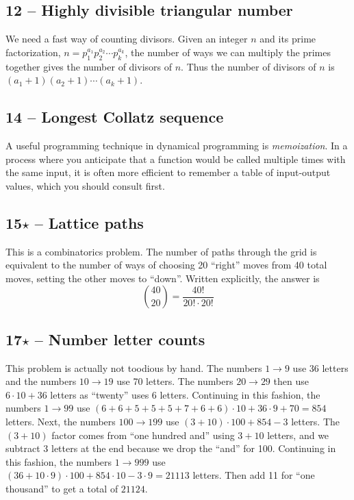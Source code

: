 \documentclass{article}
\begin{document}
\subsection*{12 -- Highly divisible triangular number} 
We need a fast way of counting divisors. 
Given an integer $n$ and its prime factorization, $n = p_1^{a_1} p_2^{a_2} \dotsb p_k^{a_k}$, the number of ways we can multiply the primes together gives the number of divisors of $n$. 
Thus the number of divisors of $n$ is $(a_1 + 1)(a_2 + 1)\dotsb(a_k+1)$. 

\subsection*{14 -- Longest Collatz sequence} 
A useful programming technique in dynamical programming is \emph{memoization}. 
In a process where you anticipate that a function would be called multiple times with the same input, it is often more efficient to remember a table of input-output values, which you should consult first.

\subsection*{15$\star$ -- Lattice paths} 
This is a combinatorics problem. 
The number of paths through the grid is equivalent to the number of ways of choosing 20 ``right'' moves from 40 total moves, setting the other moves to ``down''. 
Written explicitly, the answer is 
\[ \boxed{ \binom{40}{20} = \frac{40!}{20! \cdot 20!} } \]

\subsection*{17$\star$ -- Number letter counts} 
This problem is actually not toodious by hand. 
The numbers $1 \to 9$ use 36 letters and the numbers $10 \to 19$ use 70 letters. 
The numbers $20 \to 29$ then use $6\cdot10 + 36$ letters as ``twenty'' uses 6 letters. 
Continuing in this fashion, the numbers $1 \to 99$ use $(6+6+5+5+5+7+6+6)\cdot10 + 36\cdot9 + 70 = 854$ letters. 
Next, the numbers $100 \to 199$ use $(3+10)\cdot100 + 854 - 3$ letters. 
The $(3+10)$ factor comes from ``one hundred and'' using $3 + 10$ letters, and we subtract 3 letters at the end because we drop the ``and'' for 100. Continuing in this fashion, the numbers $1 \to 999$ use $(36 + 10\cdot9)\cdot100 + 854\cdot10 - 3\cdot9 = 21113$ letters. Then add 11 for ``one thousand'' to get a total of $\boxed{ 21124 }$.
\end{document}
